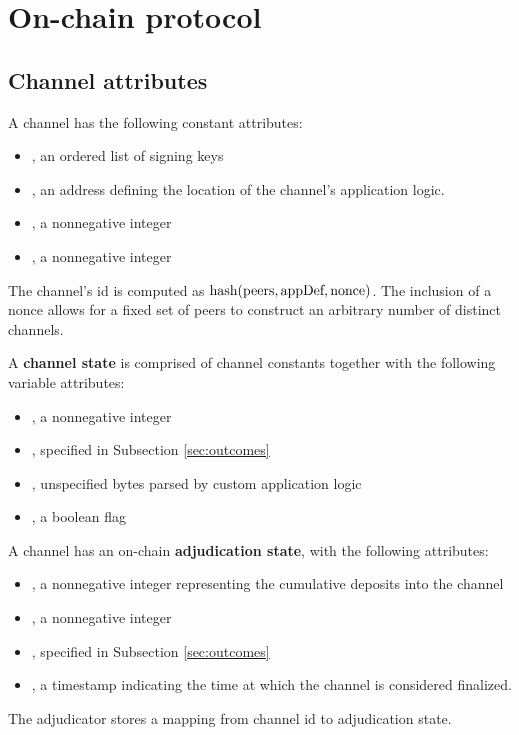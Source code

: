 \section{On-chain protocol}



\subsection{Channel attributes}

A channel has the following constant attributes:
\begin{itemize}
  \item \peers, an ordered list of signing keys
  \item \appDefinition, an address defining the location of the channel's application logic.
  \item \nonce, a nonnegative integer
  \item \challengeDuration, a nonnegative integer
\end{itemize}
The channel's id is computed as $\mbox{hash}(\mbox{peers}, \mbox{appDef}, \mbox{nonce})$. The inclusion of a nonce allows for a fixed set of peers to construct an arbitrary number of distinct channels.


A \textbf{channel state} is comprised of channel constants together with the following variable attributes:
\begin{itemize}
  \item \version, a nonnegative integer
  \item \outcome, specified in Subsection \ref{sec:outcomes}
  \item \appData, unspecified bytes parsed by custom application logic
  \item \isFinal, a boolean flag
\end{itemize}

A channel has an on-chain \textbf{adjudication state}, with the following attributes:
\begin{itemize}
  \item \holdings, a nonnegative integer representing the cumulative deposits into the channel
  \item \version, a nonnegative integer
  \item \outcome, specified in Subsection \ref{sec:outcomes}
  \item \finalizationTime, a timestamp indicating the time at which the channel is considered finalized.
\end{itemize}
The adjudicator stores a mapping from channel id to adjudication state.

